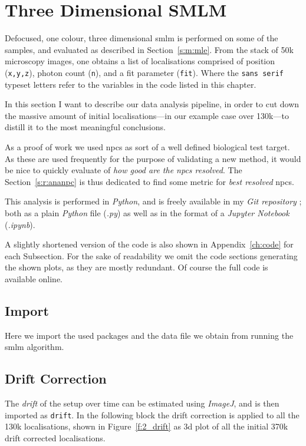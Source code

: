 \documentclass[11pt, a4paper, oneside, twocolumn]{report}
\renewcommand{\tt}{\texttt}
\newcommand{\e}{\emph}
\newcommand{\x}[1]{#1\index{#1}}
\begin{document}
\clearpage\section{Three Dimensional SMLM}\label{s:r:ana}

Defocused, one colour, three dimensional \gls{smlm} is performed on some
of the samples, and evaluated as described in
Section~\ref{s:m:mle}. From the stack of 50k microscopy images, one
obtains a list of localisations comprised of position (\tt{x,y,z}),
photon count (\tt{n}), and a fit parameter (\tt{fit}). Where the
\tt{sans serif} typeset letters refer to the variables in the code
listed in this chapter.

In this section I want to describe our data analysis pipeline, in
order to cut down the massive amount of initial localisations---in our
example case over 130k---to distill it to the most meaningful
conclusions.

As a proof of work we used \gls{npc}s as sort of a well defined
biological test target. As these are used frequently for the purpose
of validating a new method, it would be nice to quickly evaluate of
\e{how good are the \gls{npc}s resolved}. The Section~\ref{s:r:ananpc}
is thus dedicated to find some metric for \e{best resolved}
\gls{npc}s.

This analysis is performed in \e{\x{Python}}, and is freely available
in my \e{Git repository} \cite{sie21}; both as a plain \e{Python} file
(\e{.py}) as well as in the format of a \e{\x{Jupyter Notebook}}
(\e{.ipynb}).

A slightly shortened version of the code is also shown in
Appendix~\ref{ch:code} for each Subsection. For the sake of
readability we omit the code sections generating the shown plots, as
they are mostly redundant. Of course the full code is available
online.


\subsection{Import}

Here we import the used packages and the data file we obtain from
running the \gls{smlm} algorithm.


\subsection{Drift Correction}

The \e{\x{drift}} of the setup over time can be estimated using
\e{ImageJ}, and is then imported as \tt{drift}. In the following block
the drift correction is applied to all the 130k localisations, shown
in Figure~\ref{f:2_drift} as 3d plot of all the initial 370k drift
corrected localisations.
\end{document}
